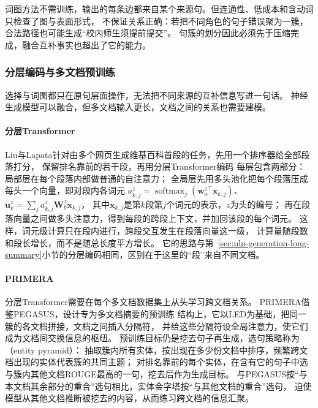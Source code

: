 词图方法不需训练，输出的每条边都来自某个来源句。但连通性、低成本和含动词只检查了图与表面形式，
不保证关系正确：若把不同角色的句子错误聚为一簇，合法路径也可能生成“校内师生须提前提交”。
句簇的划分因此必须先于压缩完成，融合互补事实也超出了它的能力。

\subsubsection{分层编码与多文档预训练}
\label{sec:nlp-generation-multi-pretraining}

选择与词图都只在原句层面操作，无法把不同来源的互补信息写进一句话。
神经生成模型可以融合，但多文档输入更长，文档之间的关系也需要建模。

\paragraph{分层Transformer}
Liu与Lapata针对由多个网页生成维基百科首段的任务，先用一个排序器给全部段落打分，
保留排名靠前的若干段，再用分层Transformer编码
每层包含两部分：局部层在每个段落内部做普通的自注意力；
全局层先用多头池化把每个段落压成每头一个向量，即对段内各词元
$a^{z}_{k,j}=\operatorname{softmax}_j(\bm w^{z\top}_a\bm x_{k,j})$、
$\bm u^{z}_k=\sum_j a^{z}_{k,j}\bm W^{z}_b\bm x_{k,j}$，
其中$\bm x_{k,j}$是第$k$段第$j$个词元的表示，$z$为头的编号；
再在段落向量之间做多头注意力，得到每段的跨段上下文，并加回该段的每个词元。
这样，词元级计算只在段内进行，跨段交互发生在段落向量这一级，
计算量随段数和段长增长，而不是随总长度平方增长。
它的思路与第~\ref{sec:nlp-generation-long-summary}小节的分层编码相同，区别在于这里的“段”来自不同文档。

\paragraph{PRIMERA}
分层Transformer需要在每个多文档数据集上从头学习跨文档关系。
PRIMERA借鉴PEGASUS，设计专为多文档摘要的预训练
结构上，它以LED为基础，把同一簇的各文档拼接，文档之间插入分隔符，
并给这些分隔符设全局注意力，使它们成为文档间交换信息的枢纽。
预训练目标仍是挖去句子再生成，选句策略称为（entity pyramid）：
抽取簇内所有实体，按出现在多少份文档中排序，频繁跨文档出现的实体代表簇的共同主题；
对排名靠前的每个实体，在含有它的句子中选与簇内其他文档ROUGE最高的一句，挖去后作为生成目标。
与PEGASUS按“与本文档其余部分的重合”选句相比，实体金字塔按“与其他文档的重合”选句，
迫使模型从其他文档推断被挖去的内容，从而练习跨文档的信息汇聚。

